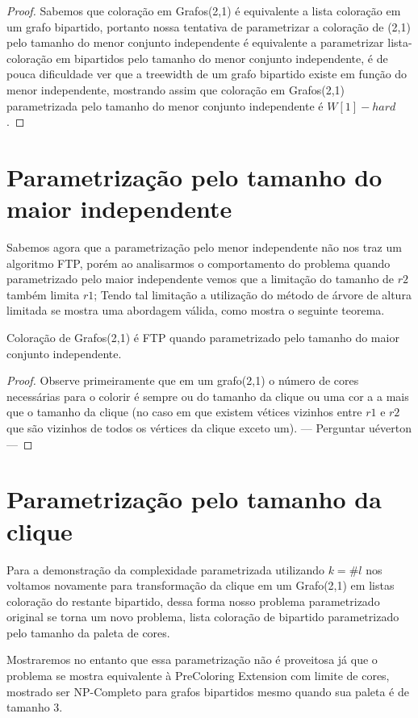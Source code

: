 \begin{proof}
	Sabemos que coloração em Grafos(2,1) é equivalente a lista coloração em um grafo bipartido, portanto nossa tentativa de parametrizar a coloração de (2,1) pelo tamanho do menor conjunto independente é equivalente a parametrizar lista-coloração em bipartidos pelo tamanho do menor conjunto independente, é de pouca dificuldade ver que a treewidth de um grafo bipartido existe em função do menor independente, mostrando assim que coloração em Grafos(2,1) parametrizada pelo tamanho do menor conjunto independente é $W[1]-hard$. 
	
\end{proof}

\section{Parametrização pelo tamanho do maior independente}

 Sabemos agora que a parametrização pelo menor independente não nos traz um algoritmo FTP, porém ao analisarmos o comportamento do problema quando parametrizado pelo maior independente vemos que a limitação do tamanho de $r2$ também limita $r1$; Tendo tal limitação a utilização do método de árvore de altura limitada se mostra uma abordagem válida, como mostra o seguinte teorema.
\begin{teorema}
  Coloração de Grafos(2,1) é FTP quando parametrizado pelo tamanho do maior conjunto independente.
\end{teorema}
\begin{proof}
 Observe primeiramente que em um grafo(2,1) o número de cores necessárias para o colorir é sempre ou do tamanho da clique ou uma cor a a mais que o tamanho da clique (no caso em que existem vétices vizinhos entre $r1$ e $r2$ que são vizinhos de todos os vértices da clique exceto um). --- Perguntar uéverton ---
\end{proof}

\section{Parametrização pelo tamanho da clique}

Para a demonstração da complexidade parametrizada utilizando $k=\#l$ nos voltamos novamente para transformação da clique em um Grafo(2,1) em listas coloração do restante bipartido, dessa forma nosso problema parametrizado original se torna um novo problema, lista coloração de bipartido parametrizado pelo tamanho da paleta de cores. 

Mostraremos no entanto que essa parametrização não é proveitosa já que o problema se mostra equivalente à PreColoring Extension com limite de cores, mostrado ser NP-Completo para grafos bipartidos mesmo quando sua paleta é de tamanho 3\cite{kratochvil94}.


